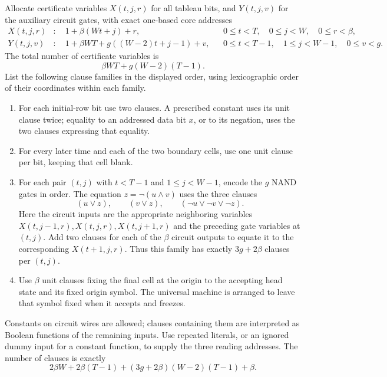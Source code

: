 Allocate certificate variables $X(t,j,r)$ for all tableau bits,
and $Y(t,j,v)$ for the auxiliary circuit gates, with exact
one-based core addresses
\begin{align*}
 X(t,j,r)&:\quad 1+\beta(Wt+j)+r,
 &&0\leq t<T,\quad 0\leq j<W,\quad 0\leq r<\beta,\\
 Y(t,j,v)&:\quad
 1+\beta WT+g((W-2)t+j-1)+v,
 &&0\leq t<T-1,\quad 1\leq j<W-1,\quad 0\leq v<g.
\end{align*}
The total number of certificate variables is
\begin{equation}\label{fr:certificate-count}
 \beta WT+g(W-2)(T-1).
\end{equation}
List the following clause families in the displayed order, using
lexicographic order of their coordinates within each family.
\begin{enumerate}
\item For each initial-row bit use two clauses.  A prescribed
constant uses its unit clause twice; equality to an addressed
data bit $x$, or to its negation, uses the two clauses expressing
that equality.
\item For every later time and each of the two boundary cells,
use one unit clause per bit, keeping that cell blank.
\item For each pair $(t,j)$ with $t<T-1$ and $1\leq j<W-1$,
encode the $g$ NAND gates in order.  The equation
$z=\neg(u\wedge v)$ uses the three clauses
\[
 (u\vee z),\qquad(v\vee z),\qquad
 (\neg u\vee\neg v\vee\neg z).
\]
Here the circuit inputs are the appropriate neighboring
variables $X(t,j-1,r),X(t,j,r),X(t,j+1,r)$ and the preceding
gate variables at $(t,j)$.  Add two clauses for each of the
$\beta$ circuit outputs to equate it to the corresponding
$X(t+1,j,r)$.  Thus this family has exactly $3g+2\beta$ clauses
per $(t,j)$.
\item Use $\beta$ unit clauses fixing the final cell at the
origin to the accepting head state and its fixed origin symbol.
The universal machine is arranged to leave that symbol fixed
when it accepts and freezes.
\end{enumerate}
Constants on circuit wires are allowed; clauses containing them
are interpreted as Boolean functions of the remaining inputs.
Use repeated literals, or an ignored dummy input for a constant
function, to supply the three reading addresses.  The number of
clauses is exactly
\begin{equation}\label{fr:clause-count}
 2\beta W+2\beta(T-1)
 +(3g+2\beta)(W-2)(T-1)+\beta.
\end{equation}

